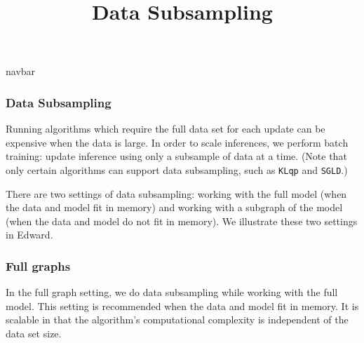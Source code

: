 \title{Data Subsampling}

{{navbar}}

\subsubsection{Data Subsampling}

Running algorithms which require the full data set for each update
can be expensive when the data is large. In order to scale inferences,
we perform batch training: update inference using
only a subsample of data at a time.
(Note that only certain algorithms can support data subsampling, such as
\texttt{KLqp} and \texttt{SGLD}.)



There are two settings of data subsampling: working with the full model
(when the data and model fit in memory) and working with a subgraph of
the model (when the data and model do not fit in memory).
We illustrate these two settings in Edward.

\subsubsection{Full graphs}

In the full graph setting, we do data subsampling while working with the
full model. This setting is recommended when the data and model fit in
memory. It is scalable in that the algorithm's computational complexity is
independent of the data set size.

